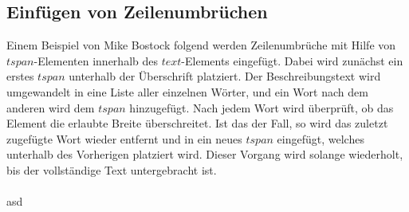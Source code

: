 \subsection{Einfügen von Zeilenumbrüchen}
Einem Beispiel von Mike Bostock folgend  werden Zeilenumbrüche mit Hilfe von $tspan$-Elementen innerhalb des $text$-Elements eingefügt. Dabei wird zunächst ein erstes $tspan$ unterhalb der Überschrift platziert. Der Beschreibungstext wird umgewandelt in eine Liste aller einzelnen Wörter, und ein Wort nach dem anderen wird dem $tspan$ hinzugefügt. Nach jedem Wort wird überprüft, ob das Element die erlaubte Breite überschreitet. Ist das der Fall, so wird das zuletzt zugefügte Wort wieder entfernt und in ein neues $tspan$ eingefügt, welches unterhalb des Vorherigen platziert wird. Dieser Vorgang wird solange wiederholt, bis der vollständige Text untergebracht ist.
\\\\
asd
























































